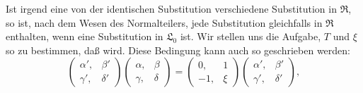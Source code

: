 Ist
irgend eine von der identischen Substitution verschiedene Substitution
 in $\mathfrak{R}$, so ist, nach dem Wesen des Normalteilers, jede
Substitution
gleichfalls in $\mathfrak{R}$ enthalten, wenn
eine  Substitution in $\mathfrak{L}_0$ ist.
Wir stellen uns die Aufgabe, $T$ und $\xi$ so zu bestimmen, daß
wird. Diese Bedingung kann auch so geschrieben werden:
\[
\begin{pmatrix}\alpha', & \beta'\\ \gamma', & \delta'\end{pmatrix}\begin{pmatrix}\alpha, & \beta\\ \gamma, & \delta\end{pmatrix}=\begin{pmatrix}0, & 1\\ -1, & \xi\end{pmatrix}\begin{pmatrix}\alpha', & \beta'\\ \gamma', & \delta'\end{pmatrix},
\]
